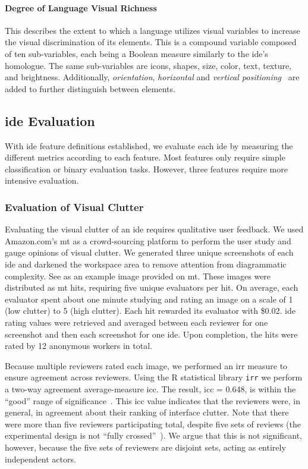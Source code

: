 \paragraph{Degree of Language Visual Richness}
This describes the extent to which a language utilizes visual variables to
increase the visual discrimination of its elements. This is a compound
variable composed of ten sub-variables, each being a Boolean measure
similarly to the \ac{ide}'s homologue. The same sub-variables are icons,
shapes, size, color, text, texture, and brightness. Additionally,
\emph{orientation}, \emph{horizontal} and \emph{vertical
positioning}~\cite{moody2009} are added to further distinguish between
elements.


\subsection{\acs{ide} Evaluation} \label{subsec:ideevaluation}

With \ac{ide} feature definitions established, we evaluate each \ac{ide} by
measuring the different metrics according to each feature. Most features
only require simple classification or binary evaluation tasks. However,
three features require more intensive evaluation.


\subsubsection{Evaluation of Visual Clutter} \label{subsubsec:mturk}

Evaluating the visual clutter of an \ac{ide} requires qualitative user
feedback. We used Amazon.com's \ac{mt} as a crowd-sourcing platform to
perform the user study and gauge opinions of visual clutter. We generated
three unique screenshots of each \ac{ide} and darkened the workspace area
to remove attention from diagrammatic complexity. See
 as an example image provided on \ac{mt}. These
images were distributed as \ac{mt} \acp{hit}, requiring five unique
evaluators per \ac{hit}. On average, each evaluator spent about one minute
studying and rating an image on a scale of 1 (low clutter) to 5 (high
clutter). Each \ac{hit} rewarded its evaluator with \$0.02. \ac{ide}
rating values were retrieved and averaged between each reviewer for one
screenshot and then each screenshot for one \ac{ide}. Upon completion, the
\acp{hit} were rated by 12 anonymous workers in total.

Because multiple reviewers rated each image, we performed an \ac{irr}
measure to ensure agreement across reviewers. Using the R statistical
library \texttt{irr} we perform a two-way agreement average-measure
\ac{icc}. The result, \ac{icc} = 0.648, is within the ``good'' range of
significance~\cite{cicchetti1994,hallgren2012}. This \ac{icc} value
indicates that the reviewers were, in general, in agreement about their
ranking of interface clutter. Note that there were more than five
reviewers participating total, despite five sets of reviews (\ie the
experimental design is not ``fully crossed''~\cite{hallgren2012}). We
argue that this is not significant, however, because the five sets of
reviewers are disjoint sets, acting as entirely independent actors.

